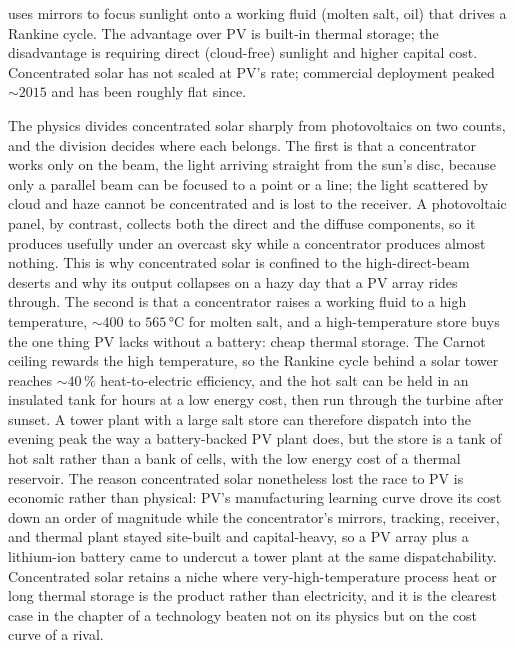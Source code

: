  uses mirrors to focus sunlight
onto a working fluid (molten salt, oil) that drives a Rankine cycle.
The advantage over PV is built-in thermal storage; the disadvantage
is requiring direct (cloud-free) sunlight and higher capital cost.
Concentrated solar has not scaled at PV's rate; commercial deployment
peaked $\sim 2015$ and has been roughly flat since.

The physics divides concentrated solar sharply from photovoltaics on two
counts, and the division decides where each belongs. The first is that a
concentrator works only on the  beam, the light arriving
straight from the sun's disc, because only a parallel beam can be focused to a
point or a line; the  light scattered by cloud and haze
cannot be concentrated and is lost to the receiver. A photovoltaic panel, by
contrast, collects both the direct and the diffuse components, so it produces
usefully under an overcast sky while a concentrator produces almost nothing.
This is why concentrated solar is confined to the high-direct-beam deserts and
why its output collapses on a hazy day that a PV array rides through. The
second is that a concentrator raises a working fluid to a high temperature,
$\sim 400$ to $565\,\si{\celsius}$ for molten salt, and a high-temperature
store buys the one thing PV lacks without a battery: cheap thermal storage.
The Carnot ceiling rewards the high temperature, so the Rankine cycle behind a
solar tower reaches $\sim 40\,\%$ heat-to-electric efficiency, and the hot
salt can be held in an insulated tank for hours at a low energy cost, then run
through the turbine after sunset. A tower plant with a large salt store can
therefore dispatch into the evening peak the way a battery-backed PV plant
does, but the store is a tank of hot salt rather than a bank of cells, with
the low energy cost of a thermal reservoir. The reason concentrated solar
nonetheless lost the race to PV is economic rather than physical: PV's
manufacturing learning curve drove its cost down an order of magnitude while
the concentrator's mirrors, tracking, receiver, and thermal plant stayed
site-built and capital-heavy, so a PV array plus a lithium-ion battery came to
undercut a tower plant at the same dispatchability. Concentrated solar retains
a niche where very-high-temperature process heat or long thermal storage is
the product rather than electricity, and it is the clearest case in the
chapter of a technology beaten not on its physics but on the cost curve of a
rival.

